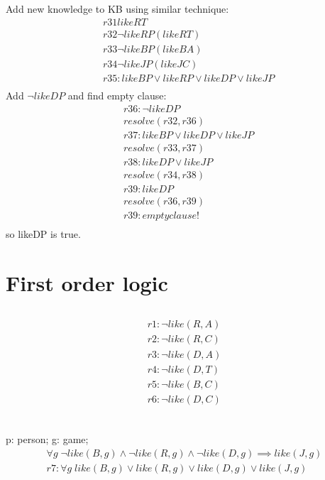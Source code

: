 \documentclass[12pt]{article}
\begin{document}
\subsection{}
Add new knowledge to KB using similar technique:
\begin{align*}
  &r31 likeRT \\
  &r32 \neg likeRP (likeRT) \\
  &r33 \neg likeBP (likeBA) \\
  &r34 \neg likeJP (likeJC)\\
  &r35: likeBP \lor likeRP \lor likeDP \lor likeJP \\
\end{align*}
Add $\neg likeDP$ and find empty clause:
\begin{align*}
  &r36: \neg likeDP \\
  &resolve(r32, r36) \\
  &r37: likeBP \lor likeDP \lor likeJP \\
  &resolve(r33, r37) \\
  &r38: likeDP \lor likeJP \\
  &resolve(r34, r38) \\
  &r39: likeDP \\
  &resolve(r36, r39) \\
  &r39: empty clause! \\
\end{align*}
so likeDP is true.
\section{First order logic}
\subsection{}
\begin{align*}
  r1: \neg like(R,A) \\
  r2: \neg like(R,C) \\
  r3: \neg like(D,A) \\
  r4: \neg like(D,T) \\
  r5: \neg like(B,C) \\
  r6: \neg like(D,C) \\
\end{align*}
\subsection{}
p: person; g: game;
\begin{align*}
  \forall g \; \neg like(B,g) \land \neg like(R,g) \land \neg like(D,g) \implies like(J,g) \\
  r7: \forall g \; like(B,g) \lor like(R,g) \lor like(D,g) \lor like(J,g) \\
\end{align*}
\end{document}
